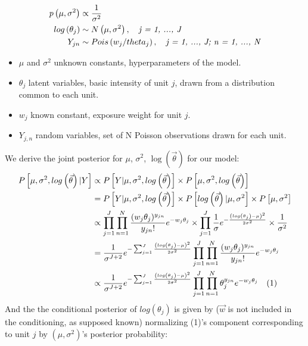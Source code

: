 \documentclass[twoside]{article}
\begin{document}
\begin{align*}
p\left(\mu, \sigma^2\right) & \propto \frac{1}{\sigma^2}\\
log\left(\theta_j\right) & \sim N\left(\mu, \sigma^2\right), \quad \textit{j = 1, ..., J}\\
Y_{jn} & \sim Pois\left(w_j \* /theta_j\right), \quad \textit{j = 1, ..., J; n = 1, ..., N} 
\end{align*}
\begin{itemize}
\item $\mu$ and $\sigma^2$ unknown constants, hyperparameters of the model.
\item $\theta_j$ latent variables, basic intensity of unit $j$, drawn from a distribution common to each unit.
\item $w_j$ known constant, exposure weight for unit $j$.
\item $Y_{j, n}$ random variables, set of N Poisson observations drawn for each unit.
\end{itemize}
\vspace{.2 in}
We derive the joint posterior for $\mu$, $\sigma^2$, $\log\left(\vec{\theta}\right)$ for our model:
\begin{align*}
P\left[\mu, \sigma^2, log\left(\vec{\theta}\right) | Y\right] & \propto	P\left[Y | \mu, \sigma^2, log\left(\vec{\theta}\right)\right] \times P\left[\mu, \sigma^2, log\left(\vec{\theta}\right)\right]\\
& = P\left[Y | \mu, \sigma^2, log\left(\vec{\theta}\right)\right] \times P\left[log\left(\vec{\theta}\right) | \mu, \sigma^2 \right] \times P\left[\mu, \sigma^2\right]\\
& \propto \prod_{j=1}^J \prod_{n=1}^N \frac{(w_j \theta_j)^{y_{jn}}}{y_{jn}!} \* e^{-w_j \* \theta_j} \times \prod_{j=1}^J \frac{1}{ \sigma} \* e^{ - \frac{\left(log\left(\theta_j\right) - \mu\right)^2}{2 \* \sigma^2}} \times \frac{1}{\sigma^2}\\
& = \frac{1}{\sigma^{J + 2}} \* e^{- \sum_{j=1}^J \frac{\left(log\left(\theta_j\right) - \mu\right)^2}{2 \* \sigma^2}} \* \prod_{j=1}^J \prod_{n=1}^N \frac{(w_j \theta_j)^{y_{jn}}}{y_{jn}!} \* e^{-w_j \* \theta_j}\\
& \propto \frac{1}{\sigma^{J + 2}} \* e^{- \sum_{j=1}^J \frac{\left(log\left(\theta_j\right) - \mu\right)^2}{2 \* \sigma^2}} \* \prod_{j=1}^J \prod_{n=1}^N \theta_j^{y_{jn}} \* e^{-w_j \* \theta_j} \quad (1)
\end{align*}
And the the conditional posterior of $log\left(\theta_j\right)$ is given by ($\vec{w}$ is not included in the conditioning, as supposed known) normalizing (1)'s component corresponding to unit $j$ by $(\mu, \sigma^2)$'s posterior probability:
\end{document}

